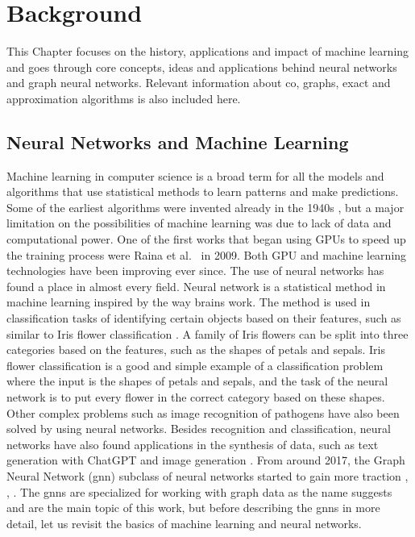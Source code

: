 \chapter{Background}
\label{sec:background}

This Chapter focuses on the history, applications and impact of machine learning and goes through core concepts, ideas and applications behind neural networks and graph neural networks. Relevant information about \gls{co}, graphs, exact and approximation algorithms is also included here.

\section{Neural Networks and Machine Learning}

Machine learning in computer science is a broad term for all the models and algorithms that use statistical methods to learn patterns and make predictions. Some of the earliest algorithms were invented already in the 1940s \cite{mlhist}, but a major limitation on the possibilities of machine learning was due to lack of data and computational power. One of the first works that began using GPUs to speed up the training process were Raina et al.\ \cite{fistgpuuse} in 2009. Both GPU and machine learning technologies have been improving ever since. The use of neural networks has found a place in almost every field. Neural network is a statistical method in machine learning inspired by the way brains work. The method is used in classification tasks of identifying certain objects based on their features, such as similar to Iris flower classification \cite{swain2012approach}. A family of Iris flowers can be split into three categories based on the features, such as the shapes of petals and sepals. Iris flower classification is a good and simple example of a classification problem where the input is the shapes of petals and sepals, and the task of the neural network is to put every flower in the correct category based on these shapes. Other complex problems such as image recognition of pathogens \cite{TRAORE2018257} have also been solved by using neural networks. Besides recognition and classification, neural networks have also found applications in the synthesis of data, such as text generation with ChatGPT \cite{RAY2023121} and image generation \cite{Liao2022CVPR}. From around 2017, the Graph Neural Network (\gls{gnn}) subclass of neural networks started to gain more traction \cite{hamilton2018inductive}, \cite{velickovic2018graph}, \cite{kipf2017semisupervised}. The \gls{gnn}s are specialized for working with graph data as the name suggests and are the main topic of this work, but before describing the \gls{gnn}s in more detail, let us revisit the basics of machine learning and neural networks.

